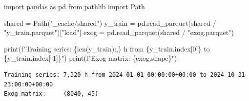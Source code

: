 \documentclass[
  english,
  letterpaper,
]{scrbook}
\newenvironment{Shaded}{\begin{snugshade}}{\end{snugshade}}
\newcommand{\BuiltInTok}[1]{\textcolor[rgb]{0.00,0.23,0.31}{#1}}
\newcommand{\DecValTok}[1]{\textcolor[rgb]{0.68,0.00,0.00}{#1}}
\newcommand{\ImportTok}[1]{\textcolor[rgb]{0.00,0.46,0.62}{#1}}
\newcommand{\NormalTok}[1]{\textcolor[rgb]{0.00,0.23,0.31}{#1}}
\newcommand{\OperatorTok}[1]{\textcolor[rgb]{0.37,0.37,0.37}{#1}}
\newcommand{\SpecialCharTok}[1]{\textcolor[rgb]{0.37,0.37,0.37}{#1}}
\newcommand{\SpecialStringTok}[1]{\textcolor[rgb]{0.13,0.47,0.30}{#1}}
\newcommand{\StringTok}[1]{\textcolor[rgb]{0.13,0.47,0.30}{#1}}
\begin{document}
\protect{}\label{load-state}
\begin{Shaded}
\begin{Highlighting}[]
\ImportTok{import}\NormalTok{ pandas }\ImportTok{as}\NormalTok{ pd}
\ImportTok{from}\NormalTok{ pathlib }\ImportTok{import}\NormalTok{ Path}

\NormalTok{shared }\OperatorTok{=}\NormalTok{ Path(}\StringTok{"\_cache/shared"}\NormalTok{)}
\NormalTok{y\_train }\OperatorTok{=}\NormalTok{ pd.read\_parquet(shared }\OperatorTok{/} \StringTok{"y\_train.parquet"}\NormalTok{)[}\StringTok{"load"}\NormalTok{]}
\NormalTok{exog    }\OperatorTok{=}\NormalTok{ pd.read\_parquet(shared }\OperatorTok{/} \StringTok{"exog.parquet"}\NormalTok{)}

\BuiltInTok{print}\NormalTok{(}\SpecialStringTok{f"Training series: }\SpecialCharTok{\{}\BuiltInTok{len}\NormalTok{(y\_train)}\SpecialCharTok{:,\}}\SpecialStringTok{ h from }\SpecialCharTok{\{}\NormalTok{y\_train}\SpecialCharTok{.}\NormalTok{index[}\DecValTok{0}\NormalTok{]}\SpecialCharTok{\}}\SpecialStringTok{ to }\SpecialCharTok{\{}\NormalTok{y\_train}\SpecialCharTok{.}\NormalTok{index[}\OperatorTok{{-}}\DecValTok{1}\NormalTok{]}\SpecialCharTok{\}}\SpecialStringTok{"}\NormalTok{)}
\BuiltInTok{print}\NormalTok{(}\SpecialStringTok{f"Exog matrix:     }\SpecialCharTok{\{}\NormalTok{exog}\SpecialCharTok{.}\NormalTok{shape}\SpecialCharTok{\}}\SpecialStringTok{"}\NormalTok{)}
\end{Highlighting}
\end{Shaded}

\begin{verbatim}
Training series: 7,320 h from 2024-01-01 00:00:00+00:00 to 2024-10-31 23:00:00+00:00
Exog matrix:     (8040, 45)
\end{verbatim}
\end{document}
